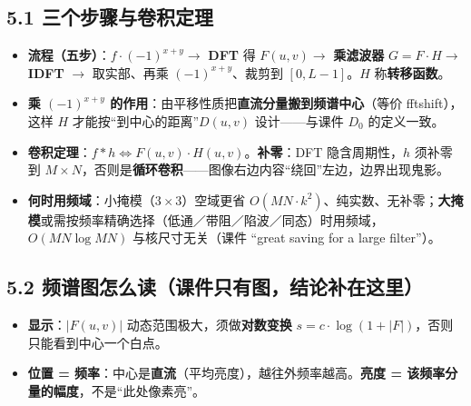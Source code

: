 \subsection*{5.1 三个步骤与卷积定理}
\begin{itemize}
\item \textbf{流程（五步）}：$f\cdot(-1)^{x+y}\to$ \textbf{DFT} 得 $F(u,v)\to$ \textbf{乘滤波器} $G=F\cdot H\to$ \textbf{IDFT} $\to$ 取实部、再乘 $(-1)^{x+y}$、裁剪到 $[0,L-1]$。$H$ 称\textbf{转移函数}。
\item \textbf{乘 $(-1)^{x+y}$ 的作用}：由平移性质把\textbf{直流分量搬到频谱中心}（等价 fftshift），这样 $H$ 才能按“到中心的距离”$D(u,v)$ 设计——与课件 $D_0$ 的定义一致。
\item \textbf{卷积定理}：$f*h\Longleftrightarrow F(u,v)\cdot H(u,v)$。\textbf{补零}：DFT 隐含周期性，$h$ 须补零到 $M\times N$，否则是\textbf{循环卷积}——图像右边内容“绕回”左边，边界出现鬼影。
\item \textbf{何时用频域}：小掩模（$3\times3$）空域更省 $O(MN\cdot k^2)$、纯实数、无补零；\textbf{大掩模}或需按频率精确选择（低通／带阻／陷波／同态）时用频域，$O(MN\log MN)$ 与核尺寸无关（课件 “great saving for a large filter”）。
\end{itemize}
\subsection*{5.2 频谱图怎么读（课件只有图，结论补在这里）}
\begin{itemize}
\item \textbf{显示}：$|F(u,v)|$ 动态范围极大，须做\textbf{对数变换} $s=c\cdot\log(1+|F|)$，否则只能看到中心一个白点。
\item \textbf{位置 = 频率}：中心是\textbf{直流}（平均亮度），越往外频率越高。\textbf{亮度 = 该频率分量的幅度}，不是“此处像素亮”。
\end{itemize}
